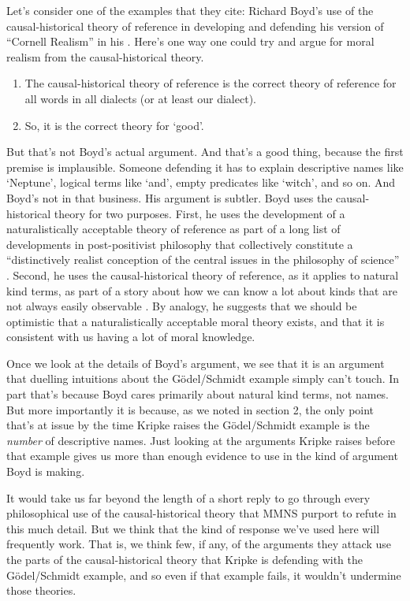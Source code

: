 Let's consider one of the examples that they cite: Richard Boyd's use of the causal-historical theory of reference in developing and defending his version of ``Cornell Realism'' in his \citeyearpar{Boyd1988}. Here's one way one could try and argue for moral realism from the causal-historical theory.

\begin{enumerate}
\item The causal-historical theory of reference is the correct theory of reference for all words in all dialects (or at least our dialect).
\item So, it is the correct theory for `good'.
\end{enumerate}

\noindent But that's not Boyd's actual argument. And that's a good thing, because the first premise is implausible. Someone defending it has to explain descriptive names like `Neptune', logical terms like `and', empty predicates like `witch', and so on. And Boyd's not in that business. His argument is subtler. Boyd uses the causal-historical theory for two purposes. First, he uses the development of a naturalistically acceptable theory of reference as part of a long list of developments in post-positivist philosophy that collectively constitute a ``distinctively realist conception of the central issues in the philosophy of science'' \cite[188]{Boyd1988}.  Second, he uses the causal-historical theory of reference, as it applies to natural kind terms, as part of a story about how we can know a lot about kinds that are not always easily observable \cite[195-196]{Boyd1988}. By analogy, he suggests that we should be optimistic that a naturalistically acceptable moral theory exists, and that it is consistent with us having a lot of moral knowledge.

Once we look at the details of Boyd's argument, we see that it is an argument that duelling intuitions about the G\"{o}del\-/\-Schmidt example simply can't touch. In part that's because Boyd cares primarily about natural kind terms, not names. But more importantly it is because, as we noted in section 2, the only point that's at issue by the time Kripke raises the G\"{o}del\-/\-Schmidt example is the \textit{number} of descriptive names. Just looking at the arguments Kripke raises before that example gives us more than enough evidence to use in the kind of argument Boyd is making.

It would take us far beyond the length of a short reply to go through every philosophical use of the causal-historical theory that MMNS purport to refute in this much detail. But we think that the kind of response we've used here will frequently work. That is, we think few, if any, of the arguments they attack use the parts of the causal-historical theory that Kripke is defending with the G\"{o}del\-/\-Schmidt example, and so even if that example fails, it wouldn't undermine those theories.

